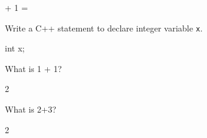 

\renewcommand\AUTHOR{jdoe5@cougars.ccis.edu} %


\renewcommand\POINTS{\textred{3/3}}
\topmattertwo

 + 1 = \cmark

\nextq
Write a C++ statement to declare integer variable \verb!x!.
\\
\ANSWER
\begin{answercode}
int x;
\end{answercode}
\vspace{-5mm}\hfill\cmark


\nextq
What is 1 + 1?
\\
\ANSWER
\begin{answerlong}
2
\end{answerlong}
\vspace{-5mm}\hfill\cmark


\nextq
What is 2+3?
\\
\ANSWER
\begin{answerlong}
2
\end{answerlong}
\vspace{-5mm}\hfill\cmark

\newpage


